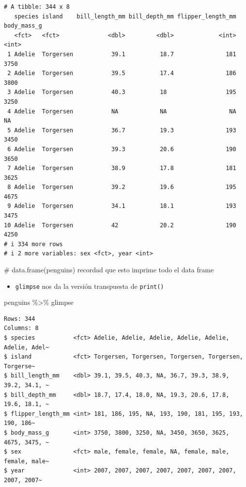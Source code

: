 \documentclass[
  letterpaper,
  DIV=11,
  numbers=noendperiod]{scrreprt}
\newenvironment{Shaded}{\begin{snugshade}}{\end{snugshade}}
\newcommand{\CommentTok}[1]{\textcolor[rgb]{0.37,0.37,0.37}{#1}}
\newcommand{\NormalTok}[1]{\textcolor[rgb]{0.00,0.23,0.31}{#1}}
\newcommand{\SpecialCharTok}[1]{\textcolor[rgb]{0.37,0.37,0.37}{#1}}
\providecommand{\tightlist}{%
  \setlength{\itemsep}{0pt}\setlength{\parskip}{0pt}}\usepackage{longtable,booktabs,array}
\begin{document}
\begin{verbatim}
# A tibble: 344 x 8
   species island    bill_length_mm bill_depth_mm flipper_length_mm body_mass_g
   <fct>   <fct>              <dbl>         <dbl>             <int>       <int>
 1 Adelie  Torgersen           39.1          18.7               181        3750
 2 Adelie  Torgersen           39.5          17.4               186        3800
 3 Adelie  Torgersen           40.3          18                 195        3250
 4 Adelie  Torgersen           NA            NA                  NA          NA
 5 Adelie  Torgersen           36.7          19.3               193        3450
 6 Adelie  Torgersen           39.3          20.6               190        3650
 7 Adelie  Torgersen           38.9          17.8               181        3625
 8 Adelie  Torgersen           39.2          19.6               195        4675
 9 Adelie  Torgersen           34.1          18.1               193        3475
10 Adelie  Torgersen           42            20.2               190        4250
# i 334 more rows
# i 2 more variables: sex <fct>, year <int>
\end{verbatim}

\begin{Shaded}
\begin{Highlighting}[]
\CommentTok{\# data.frame(penguins) recordad que esto imprime todo el data frame}
\end{Highlighting}
\end{Shaded}

\begin{itemize}
\tightlist
\item
  \texttt{glimpse} nos da la versión transpuesta de \texttt{print()}
\end{itemize}

\begin{Shaded}
\begin{Highlighting}[]
\NormalTok{penguins }\SpecialCharTok{\%\textgreater{}\%}\NormalTok{ glimpse}
\end{Highlighting}
\end{Shaded}

\begin{verbatim}
Rows: 344
Columns: 8
$ species           <fct> Adelie, Adelie, Adelie, Adelie, Adelie, Adelie, Adel~
$ island            <fct> Torgersen, Torgersen, Torgersen, Torgersen, Torgerse~
$ bill_length_mm    <dbl> 39.1, 39.5, 40.3, NA, 36.7, 39.3, 38.9, 39.2, 34.1, ~
$ bill_depth_mm     <dbl> 18.7, 17.4, 18.0, NA, 19.3, 20.6, 17.8, 19.6, 18.1, ~
$ flipper_length_mm <int> 181, 186, 195, NA, 193, 190, 181, 195, 193, 190, 186~
$ body_mass_g       <int> 3750, 3800, 3250, NA, 3450, 3650, 3625, 4675, 3475, ~
$ sex               <fct> male, female, female, NA, female, male, female, male~
$ year              <int> 2007, 2007, 2007, 2007, 2007, 2007, 2007, 2007, 2007~
\end{verbatim}
\end{document}
